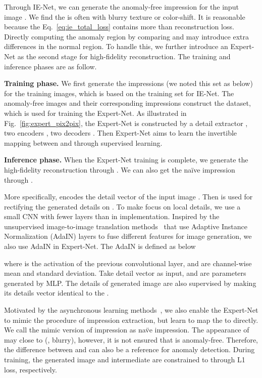 \documentclass[final]{cvpr}
\begin{document}
Through IE-Net, we can generate the anomaly-free impression  for the input image .
We find the  is often with blurry texture or color-shift. It is reasonable because the Eq.~\eqref{eq:ie_total_loss} contains more than reconstruction loss.
Directly computing the anomaly region by comparing  and  may introduce extra differences in the normal region.
To handle this, we further introduce an Expert-Net as the second stage for high-fidelity reconstruction. The training and inference phases are as follow.

\noindent\textbf{Training phase.}
We first generate the impressions (we noted this set as  below) for the training images, which is based on the training set for IE-Net. 
The anomaly-free images  and their corresponding impressions  construct the dataset, which is used for training the Expert-Net.
As illustrated in Fig.~\ref{fig:expert_pix2pix}, the Expert-Net is constructed by a detail extractor , two encoders , two decoders .
Then Expert-Net aims to learn the invertible mapping between  and  through supervised learning. 

\noindent\textbf{Inference phase.}
When the Expert-Net training is complete, we generate the high-fidelity reconstruction  through . We can also get the na\"ive impression through . 

More specifically,  encodes the detail vector  of the input image . Then  is used for rectifying the generated details on . To make  focus on local details, we use a small CNN with fewer layers than  in implementation.
Inspired by the unsupervised image-to-image translation methods~\cite{R:huang2017arbitrary,R:huang2018munit} that use 
Adaptive Instance Normalization (AdaIN) layers to fuse different features for image generation, we also use AdaIN in Expert-Net. The AdaIN is defined as below

where  is the activation of the previous convolutional layer,  and  are channel-wise mean and standard deviation. Take detail vector  as input,  and  are parameters generated by MLP.
The details of generated image  are also supervised by making its details vector  identical to the . 

Motivated by the asynchronous learning methods~\cite{R:ge2020MMT, R:he2019moco}, we also enable the Expert-Net to mimic the procedure of impression extraction, but learn to map the  to  directly. We call the mimic version of impression  as na\"ve impression. The appearance of  may close to  (\eg, blurry), however, it is not ensured that  is anomaly-free. Therefore, the difference between  and  can also be a reference for anomaly detection. 
During training, the generated image  and intermediate  are constrained to  through L1 loss, respectively. 
\end{document}
